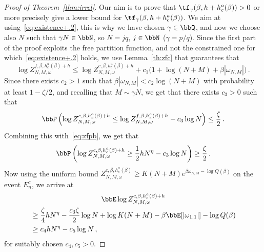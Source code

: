 \begin{proof}[Proof of Theorem~\ref{thm:irrel}]
Our aim is to prove that $\tf_\gamma(\beta, h+ h_c^{a}(\beta)) >0$ or more precisely give a lower bound for $\tf_\gamma(\beta, h+ h_c^{a}(\beta))$. We aim at using~\eqref{eq:existence+.2}, this is why we have chosen $\gamma\in \bbQ$, and now we choose also $N$ such that $\gamma N \in \bbN$, so $N=jq$, $j\in \bbN$ ($\gamma=p/q$). Since the first part of the proof exploits the free partition function, and not the constrained one for which~\eqref{eq:existence+.2} holds, we use Lemma~\ref{th:zfc} that guarantees that
\begin{equation}\label{eq:zfc1}
\log Z^{f, \beta, h_c^a(\beta) +h}_{N,M,\omega} \le
\log Z^{c, \beta, h_c^a(\beta) +h}_{N,M,\omega} + c_1\big(1 + \log (N+M) + \beta | \omega_{N,M}| \big)\,.
\end{equation}
Since there exists $c_2 >1$ such that $\beta | \omega_{N,M}| < c_2 \log (N+M)$ with probability at least $1-\zeta/2$, and recalling that $M\sim \gamma N$, we get that there exists $c_3>0$ such that
\[
\bbP \left(\log Z^{c, \beta, h_c^a(\beta) +h}_{N,M,\omega} \le \log Z^{f, \beta, h_c^a(\beta) +h}_{N,M,\omega} - c_3 \log N \right) \leq \frac{\zeta}{2}\,.
\]
Combining this with~\eqref{eq:zfpb}, we get that
\begin{equation}\label{eq:hA}
\bbP \left(\log Z^{c, \beta, h_c^a(\beta) +h}_{N,M,\omega} \ge \frac{1}{2} h N^{ \eta} - c_3\log N \right) \ge \frac{\zeta}{2}
\,.
\end{equation}
Now using the uniform bound $Z^{c, \beta, h_c^a(\beta)}_{N,M,\omega} \ge K(N+M) e^{\beta \omega_{N,M} - \log Q(\beta) }$ on the event $E_n^c$, we arrive at
\begin{multline}\label{eq:irZ}
\bbE \log Z_{N,M,\omega}^{c,\beta,h_c^a(\beta)+h}\\
\begin{aligned}
& \ge \frac{\zeta}{4} h N^{\eta} - \frac{c_3\zeta}{2} \log N + \log K(N+M) - \beta \bbE [|\omega_{1,1}|] - \log Q(\beta) \\
& \ge c_4 h N^{\eta} - c_5\log N\,,
\end{aligned}
\end{multline}
for suitably chosen $c_4,c_5 >0$.




\end{proof}

